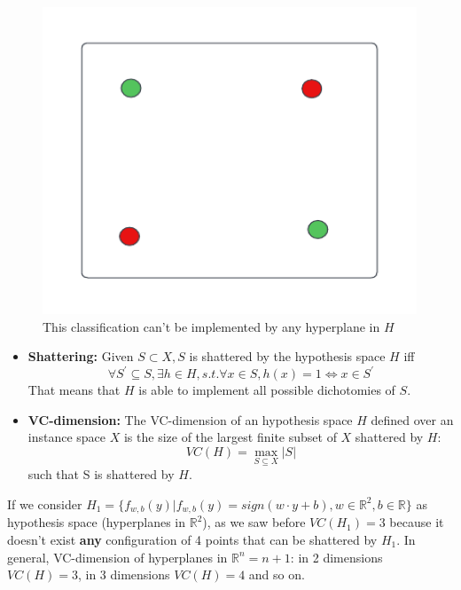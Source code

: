 \begin{figure}[h]
    \centering
    \includegraphics{images/Dichotomy 3.png}
    \caption{This classification can't be implemented by any hyperplane in $H$}
\end{figure} \newline
\begin{itemize}
    \item \textbf{Shattering: } Given $S \subset X, S$ is shattered by the hypothesis space $H$ iff 
    \[\forall S^{'} \subseteq S, \exists h \in H, s.t. \forall x \in S, h(x) = 1 \iff x \in S^{'}\]
    That means that $H$ is able to implement all possible dichotomies of $S$.
    
    \item \textbf{VC-dimension: } The VC-dimension of an hypothesis space $H$ defined over an instance space $X$ is the size of the largest finite subset of $X$ shattered by $H$: 
    \[VC(H) = \max_{S \subseteq X}|S|\]
    such that S is shattered by $H$.
\end{itemize}

If we consider $H_{1} = \{f_{w,b}(y) | f_{w,b}(y) = sign(w \cdot y + b), w \in \mathbb{R}^{2}, b \in \mathbb{R}\}$ as hypothesis space (hyperplanes in $\mathbb{R}^{2}$), as we saw before $VC(H_{1}) = 3$ because it doesn't exist \textbf{any} configuration of 4 points that can be shattered by $H_{1}$. In general, VC-dimension of hyperplanes in $\mathbb{R}^{n} = n + 1$: in 2 dimensions $VC(H) = 3$, in 3 dimensions $VC(H) = 4$ and so on.

